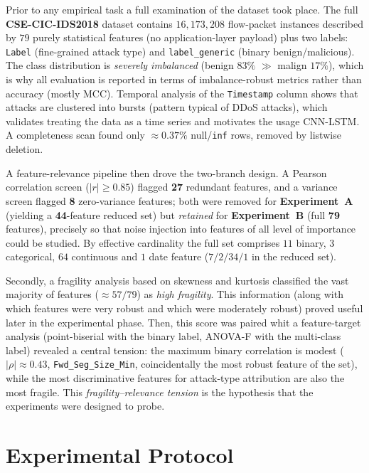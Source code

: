 \documentclass[a4paper, 9pt]{extarticle}
\begin{document}
Prior to any empirical task a full examination of the dataset took place. The full \textbf{CSE-CIC-IDS2018} dataset contains $16{,}173{,}208$ flow-packet instances described by $79$ purely statistical features (no application-layer payload) plus two labels: \texttt{Label} (fine-grained attack type) and \texttt{label\_generic}
(binary benign/malicious). The class distribution is \emph{severely imbalanced} (benign $83\%$ $\gg$ malign $17\%$), which is why all evaluation is reported in terms of imbalance-robust metrics rather than accuracy (mostly MCC). Temporal analysis of the
\texttt{Timestamp} column shows that attacks are clustered into bursts (pattern typical of DDoS attacks), which validates treating the data as a time series and motivates the usage CNN-LSTM. A completeness scan found only $\approx 0.37\%$
null/\texttt{inf} rows, removed by listwise deletion.

A feature-relevance pipeline then drove the two-branch design. A Pearson correlation screen ($|r|\ge 0.85$) flagged \textbf{27} redundant features, and a variance screen flagged \textbf{8} zero-variance features; both were removed for
\textbf{Experiment~A} (yielding a \textbf{44}-feature reduced set) but \emph{retained} for \textbf{Experiment~B} (full \textbf{79} features), precisely so that noise injection into features of all level of importance could be studied. By effective cardinality the full set comprises $11$ binary, $3$ categorical, $64$ continuous and $1$ date feature ($7/2/34/1$ in the reduced set). 

Secondly, a fragility analysis based on skewness and kurtosis classified the vast majority of features ($\approx 57/79$) as \emph{high fragility}. This information (along with which features were very robust and which were moderately robust) proved useful later in the experimental phase. Then, this score was paired whit a feature-target analysis (point-biserial with the binary label, ANOVA-F with the multi-class label) revealed a central tension: the maximum binary correlation is modest ($|\rho|\approx 0.43$, \texttt{Fwd\_Seg\_Size\_Min}, coincidentally the most robust feature of the set), while the most discriminative features for attack-type attribution are also the most fragile.
This \emph{fragility--relevance tension} is the hypothesis that the experiments were designed to probe.

\section{Experimental Protocol}
\end{document}
